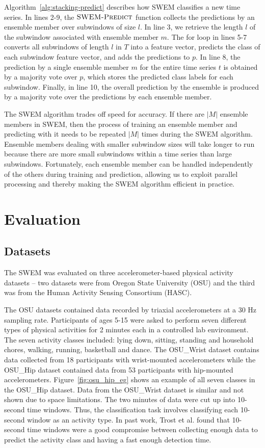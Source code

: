 \documentclass[letterpaper]{article}
\begin{document}
Algorithm~\ref{alg:stacking-predict} describes how SWEM classifies a new time series. In lines 2-9, the $\textsc{SWEM-Predict}$ function collects the predictions by an ensemble member over subwindows of size $l$. In line 3, we retrieve the length $l$ of the subwindow associated with ensemble member $m$. The for loop in lines 5-7 converts all subwindows of length $l$ in $T$ into a feature vector, predicts the class of each subwindow feature vector, and adds the predictions to $p$. In line 8, the prediction by a single ensemble member $m$ for the entire time series $t$  is obtained by a majority vote over $p$, which stores the predicted class labels for each subwindow. Finally, in line 10, the overall prediction by the ensemble is produced by a majority vote over the predictions by each ensemble member.

The SWEM algorithm trades off speed for accuracy. If there are $|M|$ ensemble members in SWEM, then the process of training an ensemble member and predicting with it needs to be repeated $|M|$ times during the SWEM algorithm. Ensemble members dealing with smaller subwindow sizes will take longer to run because there are more small subwindows within a time series than large subwindows. Fortunately, each ensemble member can be handled independently of the others during training and prediction, allowing us to exploit parallel processing and thereby making the SWEM algorithm efficient in practice.

\section{Evaluation}
\subsection{Datasets}
The SWEM was evaluated on three accelerometer-based physical activity datasets -- two datasets were from Oregon State University (OSU) and the third was from the Human Activity Sensing Consortium (HASC). 

The OSU datasets contained data recorded by triaxial accelerometers at a 30 Hz sampling rate. Participants of ages 5-15 were asked to perform seven different types of physical activities for 2 minutes each in a controlled lab environment. The seven activity classes included: lying down, sitting, standing and household chores, walking, running, basketball and dance. The OSU\_Wrist dataset contains data collected from 18 participants with wrist-mounted accelerometers while the OSU\_Hip dataset contained data from 53 participants with hip-mounted accelerometers. Figure~\ref{fig:osu_hip_eg} shows an example of all seven classes in the OSU\_Hip dataset. Data from the OSU\_Wrist dataset is similar and not shown due to space limitations. The two minutes of data were cut up into 10-second time windows. Thus, the classification task involves classifying each 10-second window as an activity type. In past work, Trost et al.  found that 10-second time windows were a good compromise between collecting enough data to predict the activity class and having a fast enough detection time. 
\end{document}
